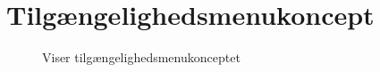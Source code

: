 \documentclass[12pt, a4paper]{article}
\begin{document}
\section{Tilgængelighedsmenukoncept}
\begin{figure}[H]
    \centering
    \caption{Viser tilgængelighedsmenukonceptet}
\end{figure}
\end{document}

